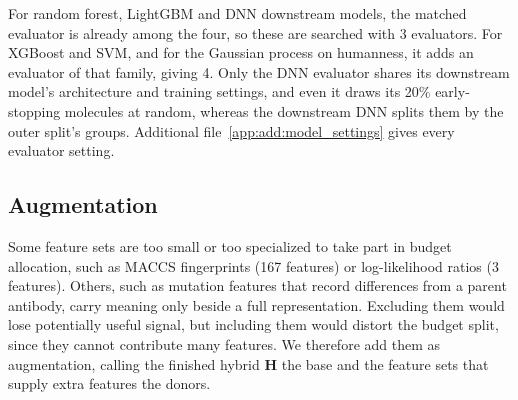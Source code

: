 For random forest, LightGBM and DNN downstream models, the matched evaluator is already among the four, so these are searched with 3 evaluators. For XGBoost and SVM, and for the Gaussian process on humanness, it adds an evaluator of that family, giving 4. Only the DNN evaluator shares its downstream model's architecture and training settings, and even it draws its 20\% early-stopping molecules at random, whereas the downstream DNN splits them by the outer split's groups. Additional file~\ref{app:add:model_settings} gives every evaluator setting.




\subsection{Augmentation}\label{sec:method:augmentation}


Some feature sets are too small or too specialized to take part in budget allocation, such as MACCS fingerprints (167 features) or log-likelihood ratios (3 features). Others, such as mutation features that record differences from a parent antibody, carry meaning only beside a full representation. Excluding them would lose potentially useful signal, but including them would distort the budget split, since they cannot contribute many features. We therefore add them as augmentation, calling the finished hybrid $\mathbf{H}$ the base and the feature sets that supply extra features the donors.


